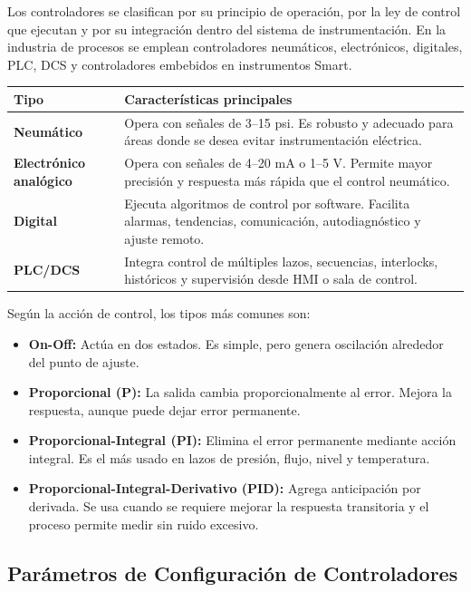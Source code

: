 \documentclass[12pt,letterpaper]{article}
\begin{document}
Los controladores se clasifican por su principio de operación, por la ley de control que ejecutan y por su integración dentro del sistema de instrumentación. En la industria de procesos se emplean controladores neumáticos, electrónicos, digitales, PLC, DCS y controladores embebidos en instrumentos Smart.

\begin{center}
\begin{tabular}{>{\bfseries}p{4.0cm} p{9.0cm}}
\toprule
\textbf{Tipo} & \textbf{Características principales} \\
\midrule
Neumático & Opera con señales de 3--15 psi. Es robusto y adecuado para áreas donde se desea evitar instrumentación eléctrica. \\
\addlinespace
Electrónico analógico & Opera con señales de 4--20 mA o 1--5 V. Permite mayor precisión y respuesta más rápida que el control neumático. \\
\addlinespace
Digital & Ejecuta algoritmos de control por software. Facilita alarmas, tendencias, comunicación, autodiagnóstico y ajuste remoto. \\
\addlinespace
PLC/DCS & Integra control de múltiples lazos, secuencias, interlocks, históricos y supervisión desde HMI o sala de control. \\
\bottomrule
\end{tabular}
\end{center}

Según la acción de control, los tipos más comunes son:

\begin{itemize}[itemsep=0.3em]
    \item \textbf{On-Off:} Actúa en dos estados. Es simple, pero genera oscilación alrededor del punto de ajuste.
    \item \textbf{Proporcional (P):} La salida cambia proporcionalmente al error. Mejora la respuesta, aunque puede dejar error permanente.
    \item \textbf{Proporcional-Integral (PI):} Elimina el error permanente mediante acción integral. Es el más usado en lazos de presión, flujo, nivel y temperatura.
    \item \textbf{Proporcional-Integral-Derivativo (PID):} Agrega anticipación por derivada. Se usa cuando se requiere mejorar la respuesta transitoria y el proceso permite medir sin ruido excesivo.
\end{itemize}

\subsection*{Parámetros de Configuración de Controladores}
\end{document}
